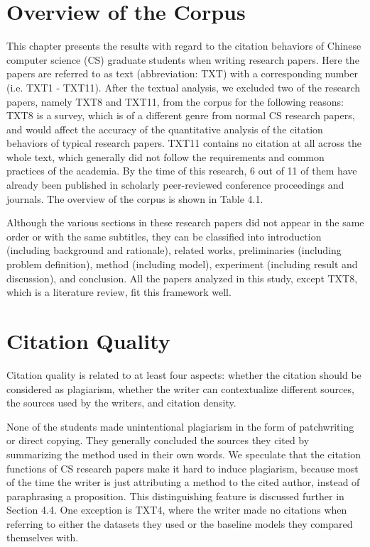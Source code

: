 
\section{Overview of the Corpus}
This chapter presents the results with regard to the citation behaviors of Chinese computer science (CS) graduate students when writing research papers. Here the papers are referred to as text (abbreviation: TXT) with a corresponding number (i.e. TXT1 - TXT11). After the textual analysis, we excluded two of the research papers, namely TXT8 and TXT11, from the corpus for the following reasons: TXT8 is a survey, which is of a different genre from normal CS research papers, and would affect the accuracy of the quantitative analysis of the citation behaviors of typical research papers. TXT11 contains no citation at all across the whole text, which generally did not follow the requirements and common practices of the academia. By the time of this research, 6 out of 11 of them have already been published in scholarly peer-reviewed conference proceedings and journals. The overview of the corpus is shown in Table 4.1.


Although the various sections in these research papers did not appear in the same order or with the same subtitles, they can be classified into introduction (including background and rationale), related works, preliminaries (including problem definition), method (including model), experiment (including result and discussion), and conclusion. All the papers analyzed in this study, except TXT8, which is a literature review, fit this framework well.

\section{Citation Quality}
Citation quality is related to at least four aspects: whether the citation should be considered as plagiarism, whether the writer can contextualize different sources, the sources used by the writers, and citation density.

None of the students made unintentional plagiarism in the form of patchwriting or direct copying. They generally concluded the sources they cited by summarizing the method used in their own words. We speculate that the citation functions of CS research papers make it hard to induce plagiarism, because most of the time the writer is just attributing a method to the cited author, instead of paraphrasing a proposition. This distinguishing feature is discussed further in Section 4.4. One exception is TXT4, where the writer made no citations when referring to either the datasets they used or the baseline models they compared themselves with.

